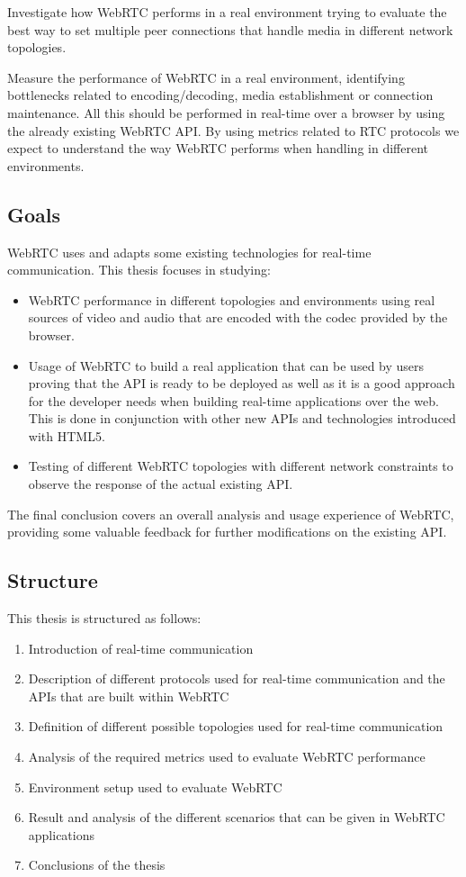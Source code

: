 Investigate how WebRTC performs in a real environment trying to evaluate the best way to set multiple peer connections that handle media in different network topologies. 

Measure the performance of WebRTC in a real environment, identifying bottlenecks related to encoding/decoding, media establishment or connection maintenance. All this should be performed in real-time over a browser by using the already existing WebRTC API. By using metrics related to RTC protocols we expect to understand the way WebRTC performs when handling in different environments.

\subsection{Goals}

WebRTC uses and adapts some existing technologies for real-time communication. This thesis focuses in studying:

\begin{itemize}
	\item WebRTC performance in different topologies and environments using real sources of video and audio that are encoded with the codec provided by the browser.
	
	\item Usage of WebRTC to build a real application that can be used by users proving that the API is ready to be deployed as well as it is a good approach for the developer needs when building real-time applications over the web. This is done in conjunction with other new APIs and technologies introduced with HTML5.
	
	\item Testing of different WebRTC topologies with different network constraints to observe the response of the actual existing API.
\end{itemize}

The final conclusion covers an overall analysis and usage experience of WebRTC, providing some valuable feedback for further modifications on the existing API.

\subsection{Structure}

This thesis is structured as follows: 

\begin{enumerate}
\item Introduction of real-time communication
\item Description of different protocols used for real-time communication and the APIs that are built within WebRTC
\item Definition of different possible topologies used for real-time communication
\item Analysis of the required metrics used to evaluate WebRTC performance
\item Environment setup used to evaluate WebRTC 
\item Result and analysis of the different scenarios that can be given in WebRTC applications
\item Conclusions of the thesis
\end{enumerate}
